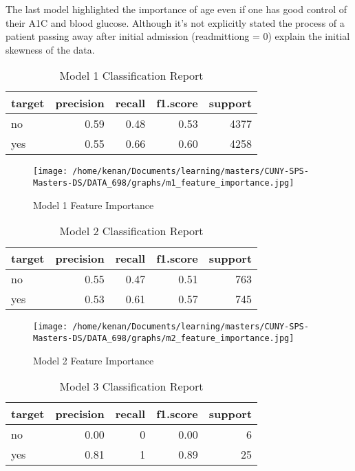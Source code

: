 \documentclass[5p]{elsarticle} %
\begin{document}
The last model highlighted the importance of age even if one has good
control of their A1C and blood glucose. Although it's not explicitly
stated the process of a patient passing away after initial admission
(readmittiong = 0) explain the initial skewness of the data.

\clearpage
\onecolumn

\begin{table}

\caption{\label{tab:unnamed-chunk-3}Model 1 Classification Report}
\centering
\begin{tabular}[t]{l|r|r|r|r}
\hline
target & precision & recall & f1.score & support\\
\hline
no & 0.59 & 0.48 & 0.53 & 4377\\
\hline
yes & 0.55 & 0.66 & 0.60 & 4258\\
\hline
\end{tabular}
\end{table}

\begin{figure}
\hypertarget{id}{%
\centering
\texttt{[image: /home/kenan/Documents/learning/masters/CUNY-SPS-Masters-DS/DATA\_698/graphs/m1\_feature\_importance.jpg]}
\caption{Model 1 Feature Importance}\label{id}
}
\end{figure}

\begin{table}

\caption{\label{tab:unnamed-chunk-4}Model 2 Classification Report}
\centering
\begin{tabular}[t]{l|r|r|r|r}
\hline
target & precision & recall & f1.score & support\\
\hline
no & 0.55 & 0.47 & 0.51 & 763\\
\hline
yes & 0.53 & 0.61 & 0.57 & 745\\
\hline
\end{tabular}
\end{table}

\begin{figure}
\hypertarget{id}{%
\centering
\texttt{[image: /home/kenan/Documents/learning/masters/CUNY-SPS-Masters-DS/DATA\_698/graphs/m2\_feature\_importance.jpg]}
\caption{Model 2 Feature Importance}\label{id}
}
\end{figure}

\begin{table}

\caption{\label{tab:unnamed-chunk-5}Model 3 Classification Report}
\centering
\begin{tabular}[t]{l|r|r|r|r}
\hline
target & precision & recall & f1.score & support\\
\hline
no & 0.00 & 0 & 0.00 & 6\\
\hline
yes & 0.81 & 1 & 0.89 & 25\\
\hline
\end{tabular}
\end{table}
\end{document}
